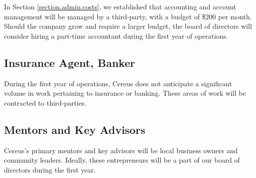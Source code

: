 In Section \ref{section.admin.costs}, we established that accounting and account management will be managed by a third-party, with a budget of \$200 per month. Should the company grow and require a larger budget, the board of directors will consider hiring a part-time accountant during the first year of operations.

\subsection{Insurance Agent, Banker}

During the first year of operations, Cereus does not anticipate a significant volume in work pertaining to insurance or banking. These areas of work will be contracted to third-parties.

\subsection{Mentors and Key Advisors}

Cereus's primary mentors and key advisors will be local business owners and community leaders. Ideally, these entrepreneurs will be a part of our board of directors during the first year.